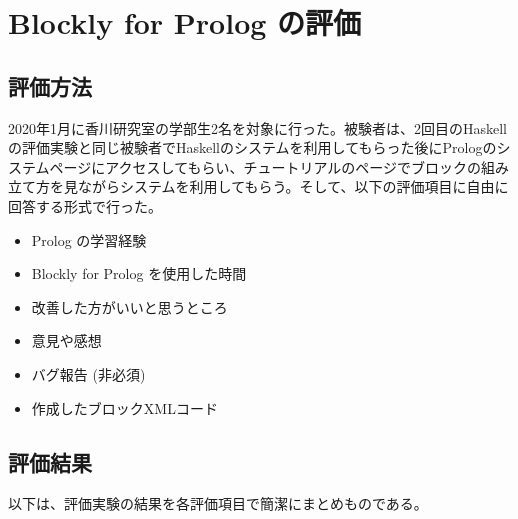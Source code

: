 \documentclass{risepaper}
\begin{document}
   \section{Blockly for Prolog の評価}
   
		\subsection{評価方法}

2020年1月に香川研究室の学部生2名を対象に行った。被験者は、2回目のHaskellの評価実験と同じ被験者でHaskellのシステムを利用してもらった後にPrologのシステムページにアクセスしてもらい、チュートリアルのページでブロックの組み立て方を見ながらシステムを利用してもらう。そして、以下の評価項目に自由に回答する形式で行った。

\begin{itemize}
\item Prolog の学習経験
\item Blockly for Prolog を使用した時間
\item 改善した方がいいと思うところ
\item 意見や感想
\item バグ報告 (非必須)
\item 作成したブロックXMLコード
\end{itemize} 

		\subsection{評価結果}

以下は、評価実験の結果を各評価項目で簡潔にまとめものである。
\end{document}
